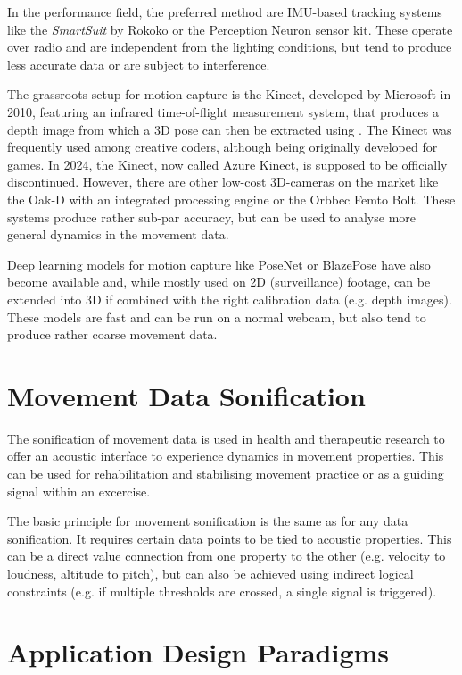 In the performance field, the preferred method are IMU-based tracking systems like the \emph{SmartSuit} by Rokoko or the Perception Neuron sensor kit. These operate over radio and are independent from the lighting conditions, but tend to produce less accurate data or are subject to interference.

The grassroots setup for motion capture is the Kinect, developed by Microsoft in 2010, featuring an infrared time-of-flight measurement system, that produces a depth image from which a 3D pose can then be extracted using . The Kinect was frequently used among creative coders, although being originally developed for games. In 2024, the Kinect, now called Azure Kinect, is supposed to be officially discontinued. However, there are other low-cost 3D-cameras on the market like the Oak-D with an integrated processing engine or the Orbbec Femto Bolt. These systems produce rather sub-par accuracy, but can be used to analyse more general dynamics in the movement data.

Deep learning models for motion capture like PoseNet or BlazePose have also become available and, while mostly used on 2D (surveillance) footage, can be extended into 3D if combined with the right calibration data (e.g. depth images). These models are fast and can be run on a normal webcam, but also tend to produce rather coarse movement data.

\section{Movement Data Sonification}

The sonification of movement data is used in health and therapeutic research to offer an acoustic interface to experience dynamics in movement properties. This can be used for rehabilitation and stabilising movement practice or as a guiding signal within an excercise.

The basic principle for movement sonification is the same as for any data sonification. It requires certain data points to be tied to acoustic properties. This can be a direct value connection from one property to the other (e.g. velocity to loudness, altitude to pitch), but can also be achieved using indirect logical constraints (e.g. if multiple thresholds are crossed, a single signal is triggered). 

\section{Application Design Paradigms}

